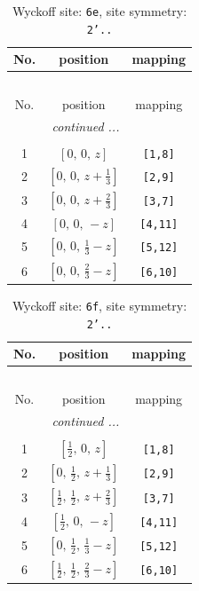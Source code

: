 \documentclass[fleqn,8pt]{jsarticle}
\begin{document}
\begin{longtable}{ccc}
\caption{Wyckoff site: {\tt 6e}, site symmetry: {\tt 2'..}}
 \\
 \hline \hline
No. & position & mapping \\ \hline \endfirsthead

\multicolumn{2}{l}{\tablename\ \thetable{}} \\
 \hline \hline
No. & position & mapping \\ \hline \endhead

 \hline \hline
\multicolumn{2}{r}{\footnotesize\it continued ...} \\ \endfoot

 \hline \hline
\multicolumn{2}{r}{} \\ \endlastfoot

1 & $\left[ 0,\, 0,\, z \right]$ & {\tt [1,8]} \\ \hline
2 & $\left[ 0,\, 0,\, z + \frac{1}{3} \right]$ & {\tt [2,9]} \\ \hline
3 & $\left[ 0,\, 0,\, z + \frac{2}{3} \right]$ & {\tt [3,7]} \\ \hline
4 & $\left[ 0,\, 0,\, - z \right]$ & {\tt [4,11]} \\ \hline
5 & $\left[ 0,\, 0,\, \frac{1}{3} - z \right]$ & {\tt [5,12]} \\ \hline
6 & $\left[ 0,\, 0,\, \frac{2}{3} - z \right]$ & {\tt [6,10]} \\
\end{longtable}
\renewcommand{\arraystretch}{1.2}
\begin{longtable}{ccc}
\caption{Wyckoff site: {\tt 6f}, site symmetry: {\tt 2'..}}
 \\
 \hline \hline
No. & position & mapping \\ \hline \endfirsthead

\multicolumn{2}{l}{\tablename\ \thetable{}} \\
 \hline \hline
No. & position & mapping \\ \hline \endhead

 \hline \hline
\multicolumn{2}{r}{\footnotesize\it continued ...} \\ \endfoot

 \hline \hline
\multicolumn{2}{r}{} \\ \endlastfoot

1 & $\left[ \frac{1}{2},\, 0,\, z \right]$ & {\tt [1,8]} \\ \hline
2 & $\left[ 0,\, \frac{1}{2},\, z + \frac{1}{3} \right]$ & {\tt [2,9]} \\ \hline
3 & $\left[ \frac{1}{2},\, \frac{1}{2},\, z + \frac{2}{3} \right]$ & {\tt [3,7]} \\ \hline
4 & $\left[ \frac{1}{2},\, 0,\, - z \right]$ & {\tt [4,11]} \\ \hline
5 & $\left[ 0,\, \frac{1}{2},\, \frac{1}{3} - z \right]$ & {\tt [5,12]} \\ \hline
6 & $\left[ \frac{1}{2},\, \frac{1}{2},\, \frac{2}{3} - z \right]$ & {\tt [6,10]} \\
\end{longtable}
\end{document}
